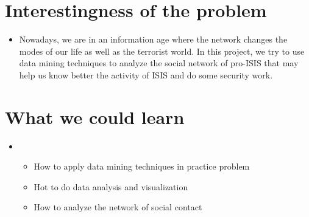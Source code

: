 \documentclass[11pt]{exam}
\begin{document}
\section{Interestingness of the problem}

\begin{itemize}

\item[]  Nowadays, we are in an information age where the network changes the modes of our life as well as the terrorist world. In this project, we try to use data mining techniques to analyze the social network of pro-ISIS that may help us know better the activity of ISIS and do some security work. \\


\end{itemize}


\section{What we could learn}

\begin{itemize}

\item[] 
\begin{itemize}
	\item How to apply data mining techniques in practice problem
	\item Hot to do data analysis and visualization
	\item How to analyze the network of social contact
\end{itemize}
\end{itemize}
\end{document}
